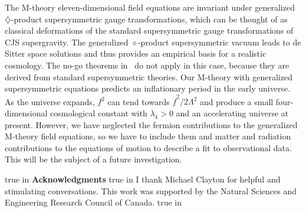 \documentclass[a4paper,12pt]{article}
\begin{document}
The M-theory eleven-dimensional field equations are invariant under
generalized $\diamondsuit$-product supersymmetric gauge transformations,
which can be thought of as classical deformations of the standard
supersymmetric gauge transformations of CJS supergravity. The generalized
$\diamond$-product supersymmetric vacuum leads to de Sitter space
solutions and thus provides an empirical basis for a realistic cosmology.
The no-go theorems in~\cite{Maldacena} do not apply in this case, because
they are derived from standard supersymmetric theories. Our M-theory with
generalized supersymmetric equations predicts an inflationary period in the
early universe. As the universe expands, $f^2$ can tend towards ${\dot
f}^2/2\Lambda^2$ and produce a small four-dimensional cosmological constant
with $\lambda_4 > 0$ and an accelerating universe at present. However, we
have neglected the fermion contributions to the generalized M-theory field
equations, so we have to include them and matter and radiation
contributions to the equations of motion to describe a fit to observational
data. This will be the subject of a future investigation.

 true in
{\bf Acknowledgments}
 true in
I thank Michael Clayton for helpful and
stimulating conversations. This work was supported by
the Natural Sciences and Engineering Research Council of Canada.
 true in
\end{document}
